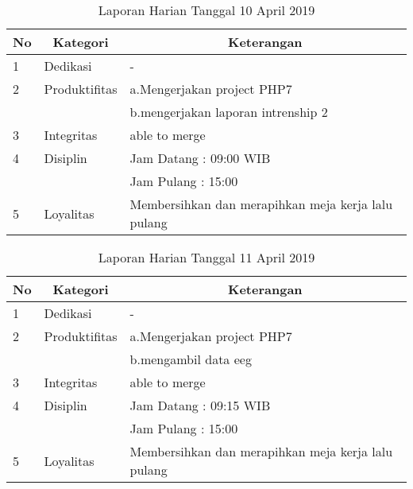 \begin{table}[htp]
\caption{Laporan Harian Tanggal 10 April 2019}
\label{tab:lh100419}
\begin{tabular}{|l|l|l|}
\hline
\textbf{No} & \multicolumn{1}{c|}{\textbf{Kategori}} & \multicolumn{1}{c|}{\textbf{Keterangan}} \\ \hline
1 & Dedikasi & - \\ \hline
2 & Produktifitas & a.Mengerjakan project PHP7 \\
   & & b.mengerjakan laporan intrenship 2 \\ \hline
3 & Integritas & able to merge \\ \hline
4 & Disiplin & Jam Datang : 09:00 WIB \\
   &  & Jam Pulang : 15:00 \\ \hline
5 & Loyalitas & Membersihkan dan merapihkan meja kerja lalu pulang \\ \hline
\end{tabular}
\end{table}

\begin{table}[htp]
\caption{Laporan Harian Tanggal 11 April 2019}
\label{tab:lh110419}
\begin{tabular}{|l|l|l|}
\hline
\textbf{No} & \multicolumn{1}{c|}{\textbf{Kategori}} & \multicolumn{1}{c|}{\textbf{Keterangan}} \\ \hline
1 & Dedikasi & - \\ \hline
2 & Produktifitas & a.Mengerjakan project PHP7 \\
   & & b.mengambil data eeg \\ \hline
3 & Integritas & able to merge \\ \hline
4 & Disiplin & Jam Datang : 09:15 WIB \\
   &  & Jam Pulang : 15:00 \\ \hline
5 & Loyalitas & Membersihkan dan merapihkan meja kerja lalu pulang \\ \hline
\end{tabular}
\end{table}